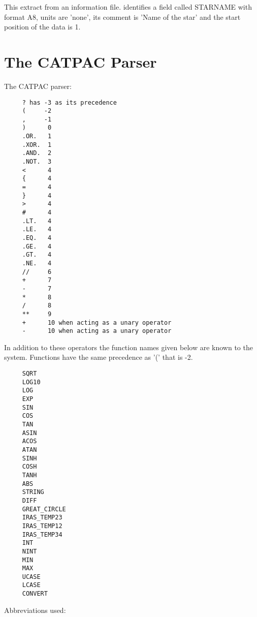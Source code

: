       This extract from an information file. identifies a field called STARNAME
      with format A8, units are 'none', its comment is 'Name of the star'
      and the start position of the data is 1.
 
\newpage
\section{The CATPAC Parser}
\label{ap:parser}

The CATPAC parser:

\begin{small}
\begin{verbatim}
     ? has -3 as its precedence
     (     -2
     ,     -1
     )      0
     .OR.   1
     .XOR.  1
     .AND.  2
     .NOT.  3
     <      4
     {      4
     =      4
     }      4
     >      4
     #      4
     .LT.   4
     .LE.   4
     .EQ.   4
     .GE.   4
     .GT.   4
     .NE.   4
     //     6
     +      7 
     -      7
     *      8
     /      8
     **     9
     +      10 when acting as a unary operator
     -      10 when acting as a unary operator
\end{verbatim}
\end{small}

In addition to these operators the function names given below are known to the
system.  Functions have the same precedence as '(' that is -2.

\begin{small}
\begin{verbatim}
     SQRT
     LOG10
     LOG
     EXP
     SIN
     COS
     TAN
     ASIN
     ACOS
     ATAN
     SINH
     COSH
     TANH
     ABS
     STRING
     DIFF
     GREAT_CIRCLE
     IRAS_TEMP23
     IRAS_TEMP12
     IRAS_TEMP34
     INT
     NINT
     MIN
     MAX
     UCASE
     LCASE
     CONVERT
\end{verbatim}
\end{small}

Abbreviations used:

